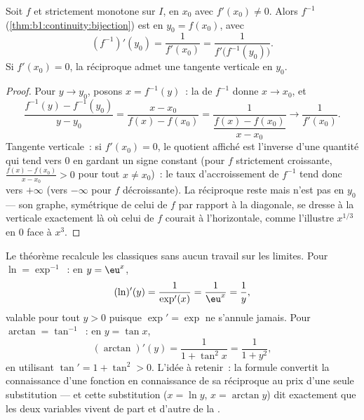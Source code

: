\begin{theorem}\label{thm:b1:derivative:inverse}
Soit $f$  et strictement monotone sur $I$, 
en $x_0$ avec $f'(x_0) \neq 0$. Alors $f^{-1}$
(\cref{thm:b1:continuity:bijection}) est  en $y_0 =
f(x_0)$, avec
\[
(f^{-1})'(y_0) = \frac{1}{f'(x_0)} = \frac{1}{f'\bigl(f^{-1}(y_0)\bigr)} .
\]
Si $f'(x_0) = 0$, la réciproque admet une tangente verticale en $y_0$.
\end{theorem}

\begin{proof}
Pour $y \to y_0$, posons $x = f^{-1}(y)$~: la  de $f^{-1}$ donne $x
\to x_0$, et
\[
\frac{f^{-1}(y) - f^{-1}(y_0)}{y - y_0}
= \frac{x - x_0}{f(x) - f(x_0)}
= \frac{1}{\dfrac{f(x) - f(x_0)}{x - x_0}}
\longrightarrow \frac{1}{f'(x_0)} .
\]
Tangente verticale~: si $f'(x_0) = 0$, le quotient affiché
est l'inverse d'une quantité qui tend vers $0$ en gardant
un signe constant (pour $f$ strictement croissante, $\frac{f(x) -
f(x_0)}{x - x_0} > 0$ pour tout $x \neq x_0$)~: le taux
d'accroissement de $f^{-1}$ tend donc vers $+\infty$ (vers $-\infty$
pour $f$ décroissante). La réciproque reste  mais n'est pas
 en $y_0$ --- son graphe, symétrique de celui de $f$ par
rapport à la diagonale, se dresse à la verticale exactement là où celui de $f$
courait à l'horizontale, comme l'illustre $x^{1/3}$ en $0$ face à $x^3$.
\end{proof}

\begin{example}\label{ex:b1:derivative:inverseaction}
Le théorème recalcule les  classiques sans aucun travail
sur les limites. Pour $\ln = \exp^{-1}$~: en $y = \eu^x$,
\[
(\ln)'(y) = \frac{1}{\exp'(x)} = \frac{1}{\eu^{x}} = \frac1y ,
\]
valable pour tout $y > 0$ puisque $\exp' = \exp$ ne s'annule jamais. Pour
$\arctan = \tan^{-1}$~: en $y = \tan x$,
\[
(\arctan)'(y) = \frac{1}{1 + \tan^2 x} = \frac{1}{1 + y^2} ,
\]
en utilisant $\tan' = 1 + \tan^2 > 0$. L'idée à retenir~: la formule
convertit la connaissance d'une fonction en connaissance de sa
réciproque au prix d'une seule substitution --- et cette
substitution ($x = \ln y$, $x = \arctan y$) dit exactement que
les deux variables vivent de part et d'autre de la .
\end{example}


